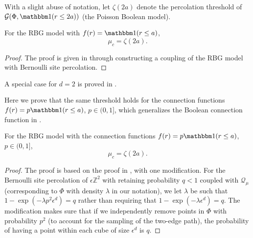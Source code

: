 With a slight abuse of notation, let $\zeta(2a)$ denote the percolation threshold of $\mathcal{G}(\Phi, \ind (r\leq 2a))$ (the Poisson Boolean model). 

\begin{lemma}{\cite[Theorem 1.1]{penrose_2014}}\label{lemma: penrose}
    For the RBG model with $f(r) = \ind (r\leq a)$,      \[\mu_c = \zeta(2a).\]   
\end{lemma}
\begin{proof}
The proof is given in \cite{penrose_2014} through constructing a coupling of the RBG model with Bernoulli site percolation.
\end{proof}
\begin{remark}
    A special case for $d=2$ is proved in \cite{iyer2012percolation}.
\end{remark}
Here we prove that the same threshold holds for the connection functions $f(r) = p\ind (r\leq a)$, $p\in(0,1]$, which generalizes the Boolean connection function in \cite{iyer2012percolation,penrose_2014}. 

 \begin{theorem}
 For the RBG model with the connection functions $f(r) = p\ind (r\leq a)$, $p\in(0,1]$, 
 \label{thm: perco-th-p-boolean}
\begin{equation}
\mu_c = \zeta(2a).
 \end{equation}

 \end{theorem}
\begin{proof}
   The proof is based on the proof in \cite[Theorem 1.1]{penrose_2014}, with one modification. For the Bernoulli site percolation of $\epsilon\mathbb{Z}^2$ with retaining probability $q<1$ coupled with $\mathcal{Q}_{\mu}$ (corresponding to $\Phi$ with density $\lambda$ in our notation), we let $\lambda$ be such that 
   $1-\exp(-\lambda p^2 \epsilon^d) = q$ rather than requiring that $1-\exp(-\lambda \epsilon^d) = q$. The modification makes sure that if we independently remove points in $\Phi$ with probability $p^2$ (to account for the sampling of the two-edge path), the probability of having a point within each cube of size $\epsilon^d$ is  $q$.
\end{proof}



